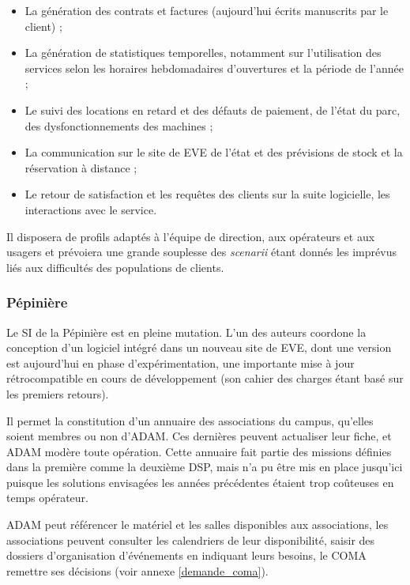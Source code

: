 \begin{itemize}
\item La génération des contrats et factures (aujourd'hui écrits manuscrits
      par le client) ;
\item La génération de statistiques temporelles, notamment sur l'utilisation
      des services selon les horaires hebdomadaires d'ouvertures et
      la période de l'année ;
\item Le suivi des locations en retard et des défauts de paiement, de l'état
      du parc, des dysfonctionnements des machines ;
\item La communication sur le site de EVE de l'état et des prévisions de
      stock et la réservation à distance ;
\item Le retour de satisfaction et les requêtes des clients sur la suite
      logicielle, les interactions avec le service.
\end{itemize}

Il disposera de profils adaptés à l'équipe de direction, aux opérateurs et
aux usagers et prévoiera une grande souplesse des \textit{scenarii} étant
donnés les imprévus liés aux difficultés des populations de clients.

\subsubsection{Pépinière}

Le SI de la Pépinière est en pleine mutation. L'un des auteurs coordone
la conception d'un logiciel intégré dans un nouveau site de EVE, dont une version
est aujourd'hui en phase d'expérimentation, une importante mise à jour
rétrocompatible en cours de développement (son cahier des charges étant basé
sur les premiers retours).

Il permet la constitution d'un annuaire des associations du campus, qu'elles
soient membres ou non d'ADAM. Ces dernières peuvent actualiser leur fiche,
et ADAM modère toute opération. Cette annuaire fait partie des missions définies
dans la première comme la deuxième DSP, mais n'a pu être mis en place jusqu'ici
puisque les solutions envisagées les années précédentes étaient trop coûteuses
en temps opérateur.

ADAM peut référencer le matériel et les salles disponibles aux associations,
les associations peuvent consulter les calendriers de leur disponibilité,
saisir des dossiers d'organisation d'événements en indiquant leurs besoins,
le COMA remettre ses décisions (voir annexe \ref{demande_coma}).

